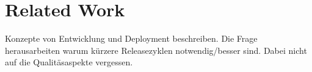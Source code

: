 \section{Related Work}
\label{sec:related-work}

Konzepte von Entwicklung und Deployment beschreiben. Die Frage herausarbeiten
warum kürzere Releasezyklen notwendig/besser sind. Dabei nicht auf die
Qualitäsaspekte vergessen.